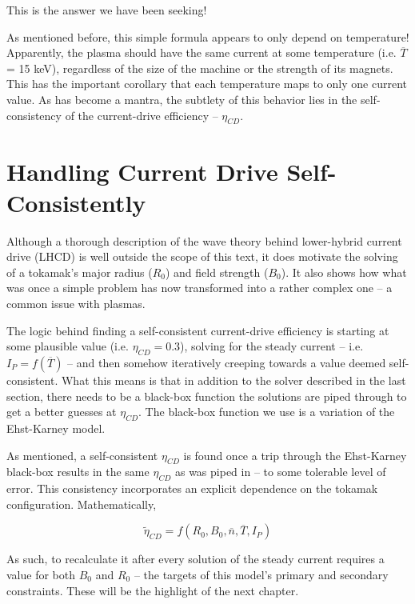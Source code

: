 This is the answer we have been seeking!

As mentioned before, this simple formula appears to only depend on temperature! Apparently, the plasma should have the same current at some temperature (i.e. $\overline T$ = 15 keV), regardless of the size of the machine or the strength of its magnets. This has the important corollary that each temperature maps to only one current value. As has become a mantra, the subtlety of this behavior lies in the self-consistency of the current-drive efficiency -- $\eta_{CD}$.

\section{Handling Current Drive Self-Consistently}

Although a thorough description of the wave theory behind lower-hybrid current drive (LHCD) is well outside the scope of this text, it does motivate the solving of a tokamak's major radius ($R_0$) and field strength ($B_0$). It also shows how what was once a simple problem has now transformed into a rather complex one -- a common issue with plasmas.

The logic behind finding a self-consistent current-drive efficiency is starting at some plausible value (i.e. $\eta_{CD} = 0.3$), solving for the steady current -- i.e. $I_P = f(\overline T)$ -- and then somehow iteratively creeping towards a value deemed self-consistent. What this means is that in addition to the solver described in the last section, there needs to be a black-box function the solutions are piped through to get a better guesses at $\eta_{CD}$. The black-box function we use is a variation of the Ehst-Karney model. \cite{ehstkarney}

As mentioned, a self-consistent $\eta_{CD}$ is found once a trip through the Ehst-Karney black-box results in the same $\eta_{CD}$ as was piped in -- to some tolerable level of error. This consistency incorporates an explicit dependence on the tokamak configuration. Mathematically,

\begin{equation}
	\tilde \eta_{CD} = f( R_0, B_0, \overline n, \overline T, I_P )
\end{equation}

As such, to recalculate it after every solution of the steady current requires a value for both $B_0$ and $R_0$ -- the targets of this model's primary and secondary constraints. These will be the highlight of the next chapter.

%
